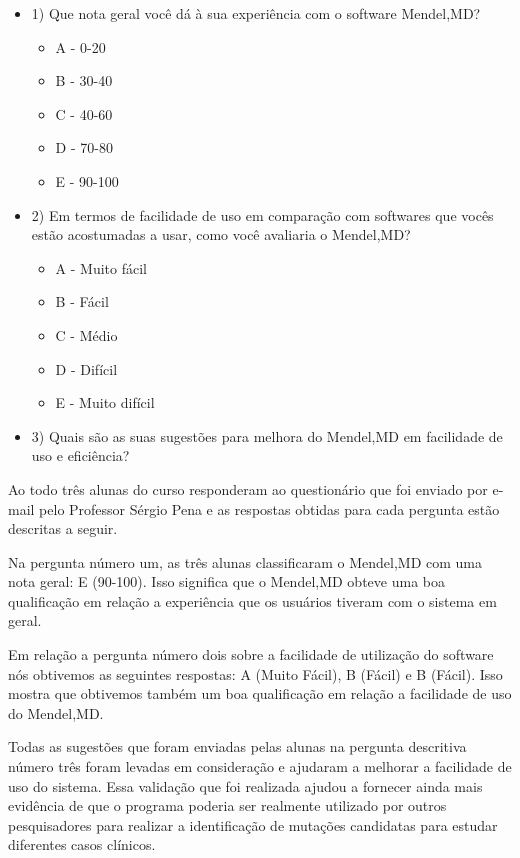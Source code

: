 \begin{itemize}
 \item 1) Que nota geral você dá à sua experiência com o software Mendel,MD?
 \begin{itemize}
  \item A - 0-20
  \item B - 30-40
  \item C - 40-60
  \item D - 70-80
  \item E - 90-100
  \end{itemize}
 \item 2) Em termos de facilidade de uso em comparação com softwares que vocês estão acostumadas a usar, como você avaliaria o Mendel,MD?
 \begin{itemize}
  \item A - Muito fácil
  \item B - Fácil
  \item C - Médio
  \item D - Difícil
  \item E - Muito difícil
  \end{itemize}
 \item 3) Quais são as suas sugestões para melhora do Mendel,MD em facilidade de uso e eficiência?
  
\end{itemize}

Ao todo três alunas do curso responderam ao questionário que foi enviado por e-mail pelo Professor Sérgio Pena e as respostas obtidas para cada pergunta estão descritas a seguir. 

Na pergunta número um, as três alunas classificaram o Mendel,MD com uma nota geral: E (90-100). Isso significa que o Mendel,MD obteve uma boa qualificação em relação a experiência que os usuários tiveram com o sistema em geral.

Em relação a pergunta número dois sobre a facilidade de utilização do software nós obtivemos as seguintes respostas: A (Muito Fácil), B (Fácil) e B (Fácil). Isso mostra que obtivemos também um boa qualificação em relação a facilidade de uso do Mendel,MD.

Todas as sugestões que foram enviadas pelas alunas na pergunta descritiva número três foram levadas em consideração e ajudaram a melhorar a facilidade de uso do sistema. Essa validação que foi realizada ajudou a fornecer ainda mais evidência de que o programa poderia ser realmente utilizado por outros pesquisadores para realizar a identificação de mutações candidatas para estudar diferentes casos clínicos.
